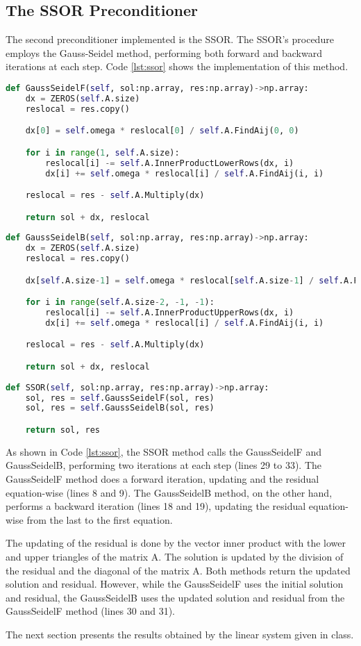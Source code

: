 \subsection{The SSOR Preconditioner}\label{sec:ssor}
The second preconditioner implemented is the SSOR. The SSOR's procedure employs the Gauss-Seidel method, performing both forward and backward iterations at each step. Code \ref{lst:ssor} shows the implementation of this method.
\begin{lstlisting}[language=python, caption={SSOR preconditioner implementation}, label={lst:ssor}]
def GaussSeidelF(self, sol:np.array, res:np.array)->np.array:
    dx = ZEROS(self.A.size)
    reslocal = res.copy()

    dx[0] = self.omega * reslocal[0] / self.A.FindAij(0, 0)

    for i in range(1, self.A.size):
        reslocal[i] -= self.A.InnerProductLowerRows(dx, i)
        dx[i] += self.omega * reslocal[i] / self.A.FindAij(i, i)

    reslocal = res - self.A.Multiply(dx)

    return sol + dx, reslocal
    
def GaussSeidelB(self, sol:np.array, res:np.array)->np.array:
    dx = ZEROS(self.A.size)
    reslocal = res.copy()

    dx[self.A.size-1] = self.omega * reslocal[self.A.size-1] / self.A.FindAij(self.A.size-1, self.A.size-1)

    for i in range(self.A.size-2, -1, -1):
        reslocal[i] -= self.A.InnerProductUpperRows(dx, i)
        dx[i] += self.omega * reslocal[i] / self.A.FindAij(i, i)

    reslocal = res - self.A.Multiply(dx)

    return sol + dx, reslocal
    
def SSOR(self, sol:np.array, res:np.array)->np.array:
    sol, res = self.GaussSeidelF(sol, res)
    sol, res = self.GaussSeidelB(sol, res)

    return sol, res 
\end{lstlisting}

As shown in Code \ref{lst:ssor}, the SSOR method calls the GaussSeidelF and GaussSeidelB, performing two iterations at each step (lines 29 to 33). The GaussSeidelF method does a forward iteration, updating and the residual equation-wise (lines 8 and 9). The GaussSeidelB method, on the other hand, performs a backward iteration (lines 18 and 19), updating the residual equation-wise from the last to the first equation. 

The updating of the residual is done by the vector inner product with the lower and upper triangles of the matrix A. The solution is updated by the division of the residual and the diagonal of the matrix A. Both methods return the updated solution and residual. However, while the GaussSeidelF uses the initial solution and residual, the GaussSeidelB uses the updated solution and residual from the GaussSeidelF method (lines 30 and 31). 

The next section presents the results obtained by the linear system given in class. 